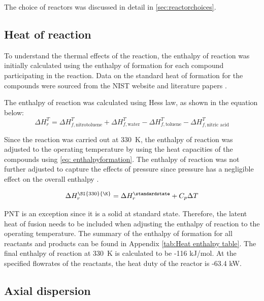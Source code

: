 The choice of reactors was discussed in detail in \cref{sec:reactorchoices}.

\subsection{Heat of reaction}
To understand the thermal effects of the reaction, the enthalpy of reaction was initially calculated using the enthalpy of formation for each compound participating in the reaction. Data on the standard heat of formation for the compounds were sourced from the NIST website and literature papers \cite{bikelyte_benchmark_2017, cox_codata_1984, di_miceli_raimondi_safety_2015, lenchitz_thermodynamic_1971, garner_heats_1921}.

The enthalpy of reaction was calculated using Hess law, as shown in the equation below:
\begin{equation}
\label{eq: enthalpyformation}
    \Delta H_{r}^{T} = \Delta H_{f,\mathrm{nitrotoluene}}^{T} + \Delta H_{f,\mathrm{water}}^{T} - \Delta H_{f,\mathrm{toluene}}^{T} - \Delta H_{f,\text{nitric acid}}^{T}
\end{equation}

Since the reaction was carried out at \SI{330}{\K}, the enthalpy of reaction was adjusted to the operating temperature by using the heat capacities of the compounds using \cref{eq: enthalpyformation}. The enthalpy of reaction was not further adjusted to capture the effects of pressure since pressure has a negligible effect on the overall enthalpy \cite{liu_nitration_2019}. 

\begin{equation}
    \Delta H_{r}^{\SI{330}{\K}} = \Delta H_{r}^{\standardstate} + C_p \Delta T
\end{equation}

PNT is an exception since it is a solid at standard state. Therefore, the latent heat of fusion needs to be included when adjusting the enthalpy of reaction to the operating temperature. The summary of the enthalpy of formation for all reactants and products can be found in Appendix \ref{tab:Heat enthalpy table}. The final enthalpy of reaction at \SI{330}{\K} is calculated to be -116 kJ/mol. At the specified flowrates of the reactants, the heat duty of the reactor is -63.4 kW.

\subsection{Axial dispersion}
\label{sec:axialdispersion}

